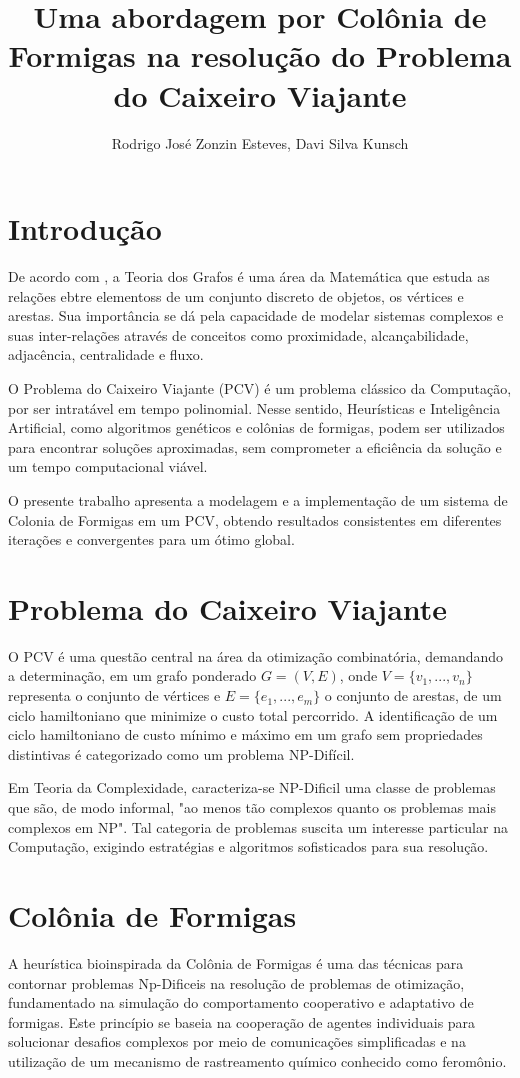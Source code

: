 \documentclass[12pt]{article}
\title{Uma abordagem por Colônia de Formigas na resolução do Problema do Caixeiro Viajante}
\author{Rodrigo José Zonzin Esteves\inst{1}, Davi Silva Kunsch\inst{1}}
\begin{document}
 

\maketitle

\section{Introdução}
De acordo com \cite{diestel2017graph}, a Teoria dos Grafos é uma área da Matemática que estuda as relações ebtre elementoss de um conjunto discreto de objetos, os vértices e arestas. Sua importância se dá pela capacidade de modelar sistemas complexos e suas inter-relações através de conceitos como proximidade, alcançabilidade, adjacência, centralidade e fluxo. 

O Problema do Caixeiro Viajante (PCV) é um problema clássico da Computação, por ser intratável em tempo polinomial. Nesse sentido, Heurísticas e Inteligência Artificial, como algoritmos genéticos e colônias de formigas, podem ser utilizados para encontrar soluções aproximadas, sem comprometer a eficiência da solução e um tempo computacional viável. \cite{goldbarg2012grafos}

O presente trabalho apresenta a modelagem e a implementação de um sistema de Colonia de Formigas em um PCV, obtendo resultados consistentes em diferentes iterações e convergentes para um ótimo global. 


\section{Problema do Caixeiro Viajante}
O PCV é uma questão central na área da otimização combinatória, demandando a determinação, em um grafo ponderado $G = (V, E)$, onde $V = \{v_1,..., v_n\}$ representa o conjunto de vértices e $E = \{e_1,..., e_m\}$ o conjunto de arestas, de um ciclo hamiltoniano que minimize o custo total percorrido. A identificação de um ciclo hamiltoniano de custo mínimo e máximo em um grafo sem propriedades distintivas é categorizado como um problema NP-Difícil. 

 Em Teoria da Complexidade, caracteriza-se NP-Dificil uma classe de problemas que são, de modo informal, "ao menos tão complexos quanto os problemas mais complexos em NP". Tal categoria de problemas suscita um interesse particular na Computação, exigindo estratégias e algoritmos sofisticados para sua resolução.
 
\section{Colônia de Formigas}
A heurística bioinspirada da Colônia de Formigas é uma das técnicas para contornar problemas Np-Dificeis  na resolução de problemas de otimização, fundamentado na simulação do comportamento cooperativo e adaptativo de formigas. Este princípio se baseia na cooperação de agentes individuais para solucionar desafios complexos por meio de comunicações simplificadas e na utilização de um mecanismo de rastreamento químico conhecido como feromônio.
\end{document}
